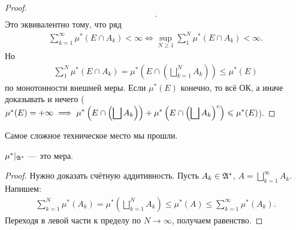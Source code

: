 \begin{proof}
\begin{align*}
 .\end{align*} Это эквивалентно тому, что ряд
 \begin{align*}
  \sum_{k=1}^{\infty}  \mu^\ast (E \cap A_k) < \infty \iff \sup_{N \geqslant 1} \sum_1^N \mu^\ast(E \cap A_k) < \infty
 .\end{align*} Но
 \begin{align*}
  \sum_{1}^{N} \mu^\ast(E \cap A_k) = \mu^\ast\left(E \cap \left(\bigsqcup_{k=1}^N A_k\right)\right) \leqslant \mu^\ast(E)
 \end{align*} по монотонности внешней меры. Если $ \mu^\ast(E) $ конечно, то всё ОК, а иначе доказывать и нечего ($ \mu^\ast(E) = +\infty \implies \displaystyle \mu^\ast\left(E \cap \left( \bigsqcup A_k \right)\right)  + \mu^\ast\left(E \cap \left( \bigsqcup A_k \right)^c\right) \leqslant \mu^\ast(E)$).
\end{proof}
Самое сложное техническое место мы прошли.
\begin{lm}
 $ \mu^\ast \rvert_{\mathfrak{A}^\ast} $ --- это мера.
\end{lm}
\begin{proof}
 Нужно доказать счётную аддитивность. Пусть $ A_k \in \mathfrak{A}^\ast $, $ A = \bigsqcup_{k=1}^\infty A_k $. Напишем:
 \begin{align*}
  \sum_{k=1}^{N} \mu^\ast(A_k) = \mu^\ast\left( \bigsqcup_{k=1}^N A_k \right) \leqslant \mu^\ast(A) \leqslant \sum_{k=1}^{\infty}  \mu^\ast(A_k)
 .\end{align*} Переходя в левой части к пределу по $ N \to \infty $, получаем равенство.
\end{proof}

